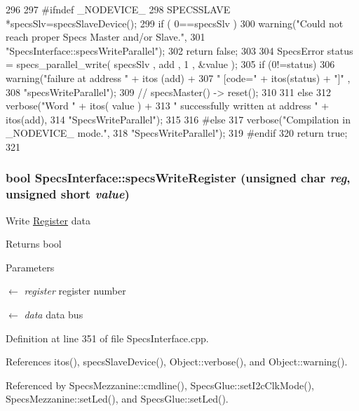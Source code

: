 \begin{DoxyCode}
296                                                 {
297 #ifndef _NODEVICE_
298   SPECSSLAVE *specsSlv=specsSlaveDevice();
299   if ( 0==specsSlv ){
300     warning("Could not reach proper Specs Master and/or Slave.",
301             "SpecsInterface::specsWriteParallel");
302     return false;
303   }
304   SpecsError status = specs_parallel_write( specsSlv , add , 1 , &value );
305   if (0!=status){
306     warning("failure at address " + itos (add) +
307             " [code=" + itos(status) + "]" ,
308             "specsWriteParallel");
309     //    specsMaster() -> reset();
310   }
311   else {
312     verbose("Word " + itos( value ) +
313             " successfully written at address " + itos(add),
314             "SpecsWriteParallel");
315   }
316 #else
317   verbose("Compilation in _NODEVICE_ mode.",
318           "SpecsWriteParallel");
319 #endif
320   return true;
321 }
\end{DoxyCode}
\hypertarget{classSpecsInterface_ab70adfa5ad87097469c7485126a3c61a}{
\subsubsection[{specsWriteRegister}]{\setlength{\rightskip}{0pt plus 5cm}bool SpecsInterface::specsWriteRegister (unsigned char {\em reg}, \/  unsigned short {\em value})}}
\label{classSpecsInterface_ab70adfa5ad87097469c7485126a3c61a}
Write \hyperlink{classRegister}{Register} data

\begin{DoxyReturn}{Returns}
bool 
\end{DoxyReturn}

\begin{DoxyParams}{Parameters}
\item[\mbox{$\leftarrow$} {\em register}]register number \item[\mbox{$\leftarrow$} {\em data}]data bus \end{DoxyParams}


Definition at line 351 of file SpecsInterface.cpp.

References itos(), specsSlaveDevice(), Object::verbose(), and Object::warning().

Referenced by SpecsMezzanine::cmdline(), SpecsGlue::setI2cClkMode(), SpecsMezzanine::setLed(), and SpecsGlue::setLed().


